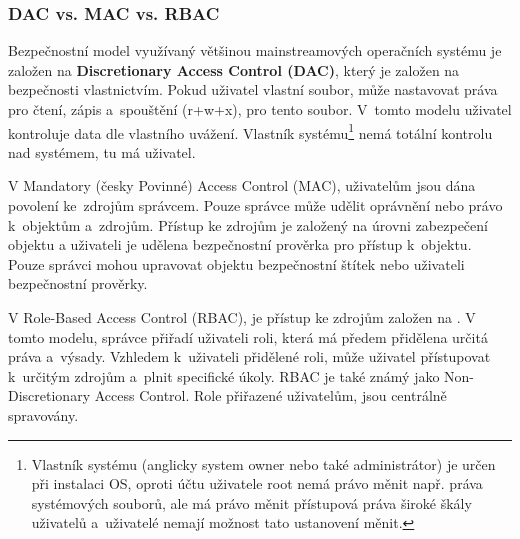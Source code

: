 \documentclass[a4paper,12pt]{article}
\renewcommand{\b}[1]{\textbf{#1}} %
\begin{document}

\subsubsection{DAC vs. MAC vs. RBAC} \label{sec:DAC}

Bezpečnostní model využívaný většinou mainstreamových operačních systému je založen na \b{Discretionary Access Control (DAC)}, který je založen na bezpečnosti vlastnictvím. Pokud uživatel vlastní soubor, může nastavovat práva pro čtení, zápis a~spouštění (r+w+x), pro tento soubor. V~tomto modelu uživatel kontroluje data dle vlastního uvážení. Vlastník systému\footnote{Vlastník systému (anglicky system owner nebo také administrátor) je určen při instalaci OS, oproti účtu uživatele root nemá právo měnit např. práva systémových souborů, ale má právo měnit přístupová práva široké škály uživatelů a~uživatelé nemají možnost tato ustanovení měnit.\cite{SystemOwner}} nemá totální kontrolu nad systémem, tu má uživatel.~\cite{Linux_com_MACvsDAC}


V Mandatory (česky Povinné) Access Control (MAC), uživatelům jsou dána povolení ke~zdrojům správcem. Pouze správce může udělit oprávnění nebo právo k~objektům a~zdrojům. Přístup ke zdrojům je založený na úrovni zabezpečení objektu a uživateli je udělena bezpečnostní prověrka pro přístup k~objektu. Pouze správci mohou upravovat objektu bezpečnostní štítek nebo uživateli bezpečnostní prověrky.

V Role-Based Access Control (RBAC), je přístup ke zdrojům založen na . V tomto modelu, správce přiřadí uživateli roli, která má předem přidělena určitá práva a~výsady. Vzhledem k~uživateli přidělené roli, může uživatel přístupovat k~určitým zdrojům a~plnit specifické úkoly. RBAC je také známý jako Non-Discretionary Access Control. Role přiřazené uživatelům, jsou centrálně spravovány.
\end{document}
